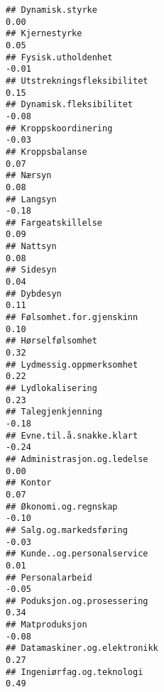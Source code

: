 \documentclass[
]{article}
\begin{document}
\begin{verbatim}
## Dynamisk.styrke                                                                   0.00
## Kjernestyrke                                                                      0.05
## Fysisk.utholdenhet                                                               -0.01
## Utstrekningsfleksibilitet                                                         0.15
## Dynamisk.fleksibilitet                                                           -0.08
## Kroppskoordinering                                                               -0.03
## Kroppsbalanse                                                                     0.07
## Nærsyn                                                                            0.08
## Langsyn                                                                          -0.18
## Fargeatskillelse                                                                  0.09
## Nattsyn                                                                           0.08
## Sidesyn                                                                           0.04
## Dybdesyn                                                                          0.11
## Følsomhet.for.gjenskinn                                                           0.10
## Hørselfølsomhet                                                                   0.32
## Lydmessig.oppmerksomhet                                                           0.22
## Lydlokalisering                                                                   0.23
## Talegjenkjenning                                                                 -0.18
## Evne.til.å.snakke.klart                                                          -0.24
## Administrasjon.og.ledelse                                                         0.00
## Kontor                                                                            0.07
## Økonomi.og.regnskap                                                              -0.10
## Salg.og.markedsføring                                                            -0.03
## Kunde..og.personalservice                                                         0.01
## Personalarbeid                                                                   -0.05
## Poduksjon.og.prosessering                                                         0.34
## Matproduksjon                                                                    -0.08
## Datamaskiner.og.elektronikk                                                       0.27
## Ingeniørfag.og.teknologi                                                          0.49

\end{verbatim}
\end{document}
